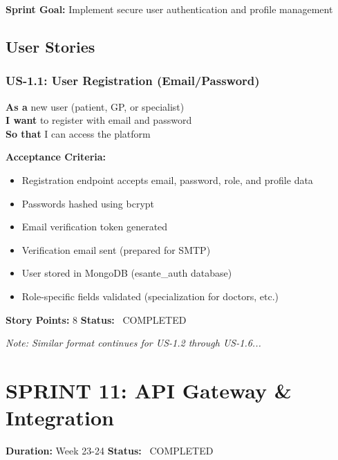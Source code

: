 \documentclass[11pt,a4paper]{article}
\begin{document}
\textbf{Sprint Goal:} Implement secure user authentication and profile management

\subsection{User Stories}

\subsubsection{US-1.1: User Registration (Email/Password)}
\begin{tcolorbox}[colback=white,colframe=primaryblue]
\textbf{As a} new user (patient, GP, or specialist)\\
\textbf{I want} to register with email and password\\
\textbf{So that} I can access the platform
\end{tcolorbox}

\textbf{Acceptance Criteria:}
\begin{itemize}[label=\textcolor{successgreen}{\faCheck}]
    \item Registration endpoint accepts email, password, role, and profile data
    \item Passwords hashed using bcrypt
    \item Email verification token generated
    \item Verification email sent (prepared for SMTP)
    \item User stored in MongoDB (esante\_auth database)
    \item Role-specific fields validated (specialization for doctors, etc.)
\end{itemize}

\textbf{Story Points:} 8 \hfill \textbf{Status:} \textcolor{successgreen}{\faCheckCircle\ COMPLETED}

\vspace{0.5cm}

\textit{Note: Similar format continues for US-1.2 through US-1.6...}

\newpage

\section{SPRINT 11: API Gateway \& Integration}
\textbf{Duration:} Week 23-24 \hfill \textbf{Status:} \textcolor{successgreen}{\faCheckCircle\ COMPLETED}
\end{document}

